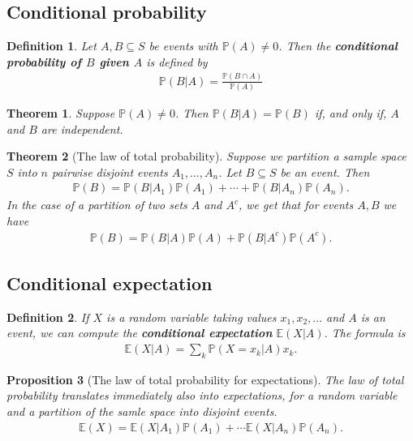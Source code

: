 \documentclass{article}
\theoremstyle{sltheorem}
\newtheorem{definition}{Definition}[section]
\newtheorem{theorem}{Theorem}[section]
\newtheorem{proposition}[theorem]{Proposition}
\renewcommand{\P}{\mathbb{P}}
\newcommand{\E}{\mathbb{E}}
\newcommand*\B[1]{\textbf{#1}}
\begin{document}
\subsection{Conditional probability}
\begin{definition}
    Let $A,B\subseteq S$ be events with $\P(A)\not=0$. Then the 
    \B{conditional probability of $B$ given $A$} is defined by
    \begin{align*}
        \P(B|A) = \frac{\P(B\cap A)}{\P(A)}
    \end{align*}
\end{definition}
\begin{theorem}
    Suppose $\P(A)\not= 0$. Then $\P(B|A)=\P(B)$ if, and only if, $A$ and $B$ are independent.
\end{theorem}
\begin{theorem}[The law of total probability]
    Suppose we partition a sample space $S$ into $n$ pairwise disjoint events $A_1, ..., A_n$.
    Let $B\subseteq S$ be an event. Then
    \begin{align*}
        \P(B)=\P(B|A_1)\P(A_1)+ \cdots + \P(B|A_n)\P(A_n).
    \end{align*} 
    In the case of a partition of two sets $A$ and $A^c$, we get that for events $A,B$ we have
    \begin{align*}
        \P(B) = \P(B|A)\P(A)+\P(B|A^c)\P(A^c).
    \end{align*}
\end{theorem}
\subsection{Conditional expectation}
\begin{definition}
    If $X$ is a random variable taking values $x_1, x_2, ...$ and $A$ is an event, we can
    compute the \B{conditional expectation} $\E(X|A)$. The formula is
    \begin{align*}
        \E(X|A) = \sum_k \P(X=x_k|A)x_k.
    \end{align*}
\end{definition}
\begin{proposition}[The law of total probability for expectations]
    The law of total probability translates immediately also into expectations, for a random
    variable and a partition of the samle space into disjoint events.
    \begin{align*}
        \E(X) = \E(X|A_1)\P(A_1)+\cdots\E(X|A_n)\P(A_n).
    \end{align*} 
\end{proposition}
\end{document}

